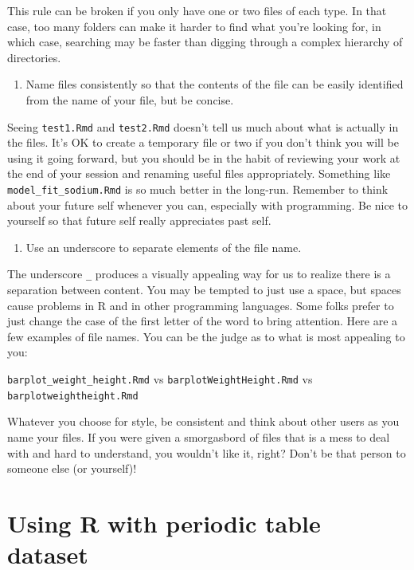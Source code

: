 \documentclass[]{tufte-book}
\providecommand{\tightlist}{%
  \setlength{\itemsep}{0pt}\setlength{\parskip}{0pt}}
\begin{document}
This rule can be broken if you only have one or two files of each type. In that
case, too many folders can make it harder to find what you're looking for, in which
case, searching may be faster than digging through a complex hierarchy of directories.

\begin{enumerate}
\def\labelenumi{\arabic{enumi}.}
\setcounter{enumi}{1}
\tightlist
\item
  Name files consistently so that the contents of the file can be easily
  identified from the name of your file, but be concise.
\end{enumerate}

Seeing \texttt{test1.Rmd} and \texttt{test2.Rmd} doesn't tell us much about what is actually
in the files. It's OK to create a temporary file or two if you don't think you
will be using it going forward, but you should be in the habit of reviewing your
work at the end of your session and renaming useful files appropriately.
Something like \texttt{model\_fit\_sodium.Rmd} is so much better in the long-run.
Remember to think about your future self whenever you can, especially with
programming. Be nice to yourself so that future self really appreciates past self.

\begin{enumerate}
\def\labelenumi{\arabic{enumi}.}
\setcounter{enumi}{2}
\tightlist
\item
  Use an underscore to separate elements of the file name.
\end{enumerate}

The underscore \texttt{\_} produces a visually appealing way for us to realize there is
a separation between content. You may be tempted to just use a space, but spaces
cause problems in R and in other programming languages. Some folks prefer to just
change the case of the first letter of the word to bring attention. Here are a few
examples of file names. You can be the judge as to what is most appealing to you:

\texttt{barplot\_weight\_height.Rmd} vs \texttt{barplotWeightHeight.Rmd} vs \texttt{barplotweightheight.Rmd}

Whatever you choose for style, be consistent and think about other users as you
name your files. If you were given a smorgasbord of files that is a mess to
deal with and hard to understand, you wouldn't like it, right? Don't be that
person to someone else (or yourself)!

\section{Using R with periodic table dataset}\label{using-r-with-periodic-table-dataset}
\end{document}
